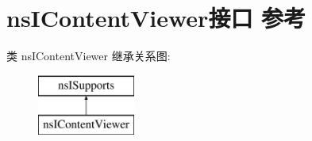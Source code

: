 \hypertarget{interfacens_i_content_viewer}{}\section{ns\+I\+Content\+Viewer接口 参考}
\label{interfacens_i_content_viewer}
类 ns\+I\+Content\+Viewer 继承关系图\+:\begin{figure}[H]
\begin{center}
\leavevmode
\includegraphics[height=2.000000cm]{interfacens_i_content_viewer}
\end{center}
\end{figure}
